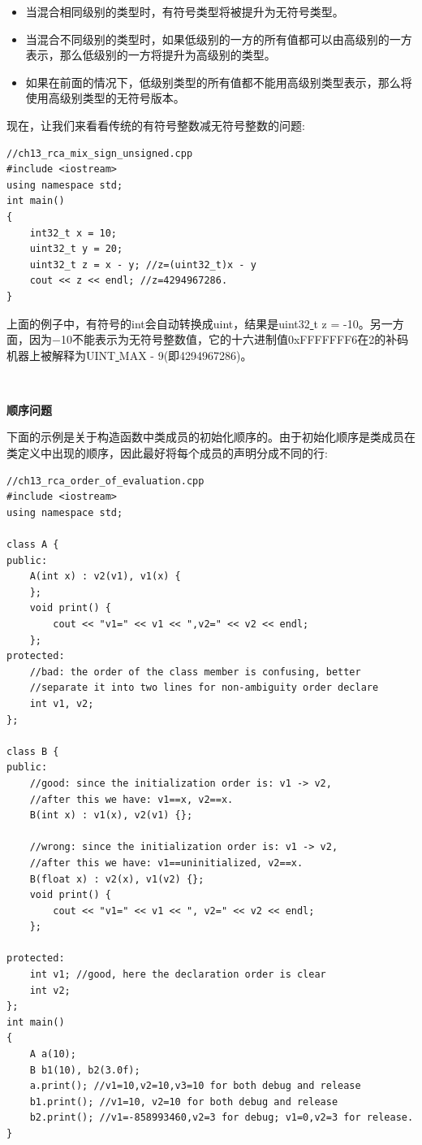 \begin{itemize}
	\item 当混合相同级别的类型时，有符号类型将被提升为无符号类型。
	\item 当混合不同级别的类型时，如果低级别的一方的所有值都可以由高级别的一方表示，那么低级别的一方将提升为高级别的类型。
	\item 如果在前面的情况下，低级别类型的所有值都不能用高级别类型表示，那么将使用高级别类型的无符号版本。
\end{itemize}

现在，让我们来看看传统的有符号整数减无符号整数的问题: \par

\begin{lstlisting}[caption={}]
//ch13_rca_mix_sign_unsigned.cpp
#include <iostream>
using namespace std;
int main()
{
	int32_t x = 10;
	uint32_t y = 20;
	uint32_t z = x - y; //z=(uint32_t)x - y
	cout << z << endl; //z=4294967286.
}
\end{lstlisting}

上面的例子中，有符号的int会自动转换成uint，结果是uint32\underline{ }t z = -10。另一方面，因为−10不能表示为无符号整数值，它的十六进制值0xFFFFFFF6在2的补码机器上被解释为UINT\underline{ }MAX - 9(即4294967286)。 \par

\noindent\textbf{}\ \par
\textbf{顺序问题} \ \par
下面的示例是关于构造函数中类成员的初始化顺序的。由于初始化顺序是类成员在类定义中出现的顺序，因此最好将每个成员的声明分成不同的行: \par

\begin{lstlisting}[caption={}]
//ch13_rca_order_of_evaluation.cpp
#include <iostream>
using namespace std;

class A {
public:
	A(int x) : v2(v1), v1(x) {
	};
	void print() {
		cout << "v1=" << v1 << ",v2=" << v2 << endl;
	};
protected:
	//bad: the order of the class member is confusing, better
	//separate it into two lines for non-ambiguity order declare
	int v1, v2;
};

class B {
public:
	//good: since the initialization order is: v1 -> v2,
	//after this we have: v1==x, v2==x.
	B(int x) : v1(x), v2(v1) {};
	
	//wrong: since the initialization order is: v1 -> v2,
	//after this we have: v1==uninitialized, v2==x.
	B(float x) : v2(x), v1(v2) {};
	void print() {
		cout << "v1=" << v1 << ", v2=" << v2 << endl;
	};

protected:
	int v1; //good, here the declaration order is clear
	int v2;
};
int main()
{
	A a(10);
	B b1(10), b2(3.0f);
	a.print(); //v1=10,v2=10,v3=10 for both debug and release
	b1.print(); //v1=10, v2=10 for both debug and release
	b2.print(); //v1=-858993460,v2=3 for debug; v1=0,v2=3 for release.
}
\end{lstlisting}

